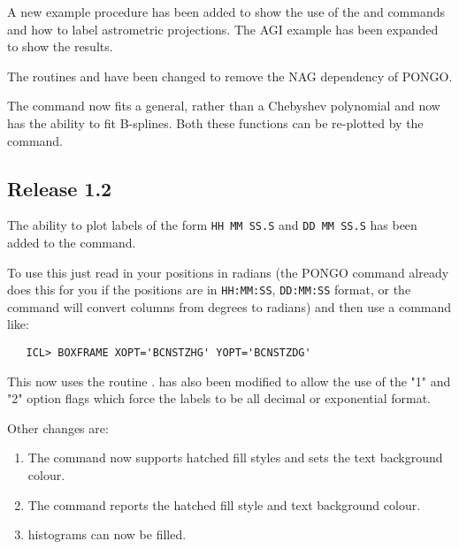 A new example procedure has been added to show the use of the
 and  commands and how to label
astrometric projections.  The AGI example has been expanded to show
the results.

The routines  and  have
been changed to remove the NAG dependency of PONGO.

The  command now fits a general, rather than a Chebyshev
polynomial and now has the ability to fit B-splines. Both these
functions can be re-plotted by the  command.

\subsection{Release 1.2}

The ability to plot labels of the form \verb+HH MM SS.S+ and
\verb+DD MM SS.S+ has been added to the 
command.

To use this just read in your positions in radians (the PONGO
command  already does this for you if the
positions are in \verb+HH:MM:SS+, \verb+DD:MM:SS+ format, or the
 command will convert
columns from degrees to radians) and then use a command like:
\begin{verbatim}
   ICL> BOXFRAME XOPT='BCNSTZHG' YOPT='BCNSTZDG'
\end{verbatim}
This now uses the  routine
.
 has also been modified to allow the use of the "1" and "2"
option flags which force the labels to be all decimal or exponential
format.

Other changes are:
\begin{enumerate}
\item The  command now supports hatched fill styles
and sets the
text background colour.
\item The  command reports the hatched fill style and text background
colour.
\item {} histograms can now be filled.
\end{enumerate}



